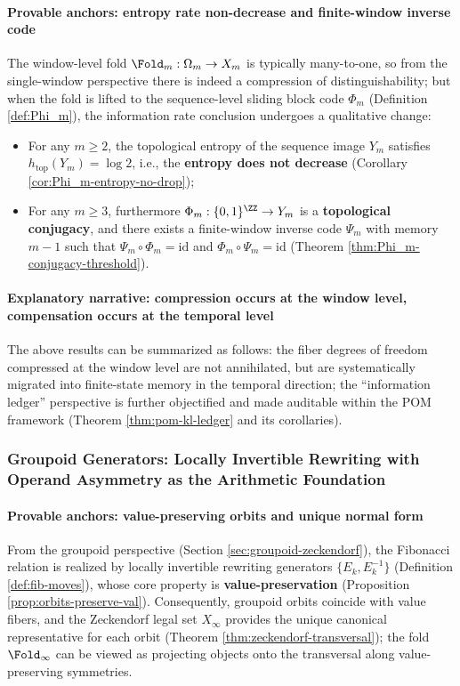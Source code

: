 \paragraph{Provable anchors: entropy rate non-decrease and finite-window inverse code}
The window-level fold \(\Fold_m:\Omega_m\to X_m\) is typically many-to-one, so from the single-window perspective there is indeed a compression of distinguishability; but when the fold is lifted to the sequence-level sliding block code \(\Phi_m\) (Definition \ref{def:Phi_m}), the information rate conclusion undergoes a qualitative change:
\begin{itemize}
  \item For any \(m\ge 2\), the topological entropy of the sequence image \(Y_m\) satisfies \(h_{\mathrm{top}}(Y_m)=\log 2\), i.e., the \textbf{entropy does not decrease} (Corollary \ref{cor:Phi_m-entropy-no-drop});
  \item For any \(m\ge 3\), furthermore \(\Phi_m:\{0,1\}^{\ZZ}\to Y_m\) is a \textbf{topological conjugacy}, and there exists a finite-window inverse code \(\Psi_m\) with memory \(m-1\) such that \(\Psi_m\circ\Phi_m=\mathrm{id}\) and \(\Phi_m\circ\Psi_m=\mathrm{id}\) (Theorem \ref{thm:Phi_m-conjugacy-threshold}).
\end{itemize}

\paragraph{Explanatory narrative: compression occurs at the window level, compensation occurs at the temporal level}
The above results can be summarized as follows: the fiber degrees of freedom compressed at the window level are not annihilated, but are systematically migrated into finite-state memory in the temporal direction; the ``information ledger'' perspective is further objectified and made auditable within the POM framework (Theorem \ref{thm:pom-kl-ledger} and its corollaries).

\subsubsection{Groupoid Generators: Locally Invertible Rewriting with Operand Asymmetry as the Arithmetic Foundation}\label{subsubsec:insight-groupoid-generators}
\paragraph{Provable anchors: value-preserving orbits and unique normal form}
From the groupoid perspective (Section \ref{sec:groupoid-zeckendorf}), the Fibonacci relation is realized by locally invertible rewriting generators \(\{E_k,E_k^{-1}\}\) (Definition \ref{def:fib-moves}), whose core property is \textbf{value-preservation} (Proposition \ref{prop:orbits-preserve-val}). Consequently, groupoid orbits coincide with value fibers, and the Zeckendorf legal set \(X_\infty\) provides the unique canonical representative for each orbit (Theorem \ref{thm:zeckendorf-transversal}); the fold \(\Fold_\infty\) can be viewed as projecting objects onto the transversal along value-preserving symmetries.

